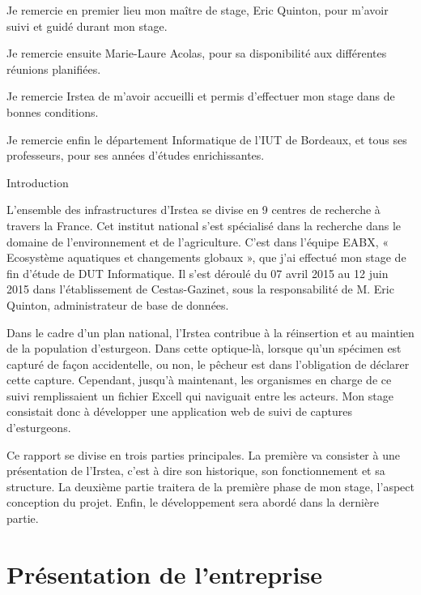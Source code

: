 \documentclass[12pt,a4paper,titlepage,twoside]{report}
\begin{document}
Je remercie en premier lieu mon maître de stage, Eric Quinton, pour m'avoir suivi et guidé durant mon stage.\newline

Je remercie ensuite Marie-Laure Acolas, pour sa disponibilité aux différentes réunions planifiées.\newline

Je remercie Irstea de m'avoir accueilli et permis d'effectuer mon stage dans de bonnes conditions.\newline

Je remercie enfin le département Informatique de l'IUT de Bordeaux, et tous ses professeurs, pour ses années d'études enrichissantes.\newline
\cleardoublepage
\tableofcontents
\cleardoublepage
\listoffigures
\cleardoublepage
\LARGE{Introduction}\normalsize\newline

	L'ensemble des infrastructures d'Irstea se divise en 9 centres de recherche à travers la France. Cet institut national s'est spécialisé dans la recherche dans le domaine de l’environnement et de l'agriculture. C'est dans l'équipe EABX, « Ecosystème aquatiques et changements globaux », que j'ai effectué mon stage de fin d’étude de DUT Informatique. Il s'est déroulé du 07 avril 2015 au 12 juin 2015 dans l'établissement de Cestas-Gazinet, sous la responsabilité de M. Eric Quinton, administrateur de base de données.
\newline

	Dans le cadre d'un plan national, l'Irstea contribue à la réinsertion et au maintien de la population d'esturgeon. Dans cette optique-là, lorsque qu'un spécimen est capturé de façon accidentelle, ou non, le pêcheur est dans l'obligation de déclarer cette capture. Cependant, jusqu'à maintenant, les organismes en charge de ce suivi remplissaient un fichier Excell qui naviguait entre les acteurs. Mon stage consistait donc à développer une application web de suivi de captures d'esturgeons.\newline
	
	Ce rapport se divise en trois parties principales. La première va consister à une présentation de l'Irstea, c'est à dire son historique, son fonctionnement et sa structure. La deuxième partie traitera de la première phase de mon stage, l'aspect conception du projet. Enfin, le développement sera abordé dans la dernière partie.

\clearpage
\chapter{Présentation de l'entreprise}
\end{document}
